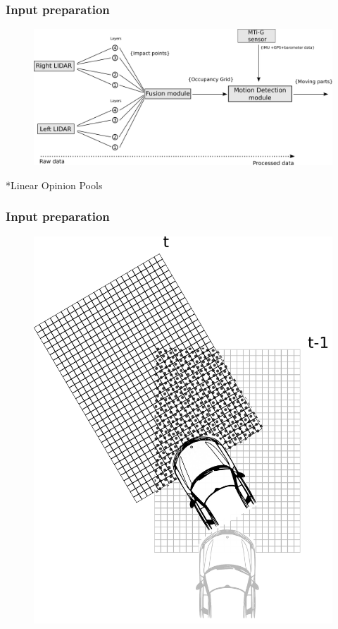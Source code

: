 \documentclass{beamer}
\begin{document}
\begin{frame}
	\end{frame}

	

	\begin{frame}
		\frametitle{Input preparation}
		\begin{figure}[h]
			\center
			\includegraphics[scale=0.18]{../img/fig:motion:framework}
		\end{figure}
		
		*Linear Opinion Pools \cite{ADARVE-2012-671211}
	
	\end{frame}

	\begin{frame}
		\frametitle{Input preparation}
		\begin{figure}[h]
			\center
			\includegraphics[scale=0.2]{../img/fig:motion:algorithm:nonstatic:01}
		\end{figure}
	
	\end{frame}
\end{document}
